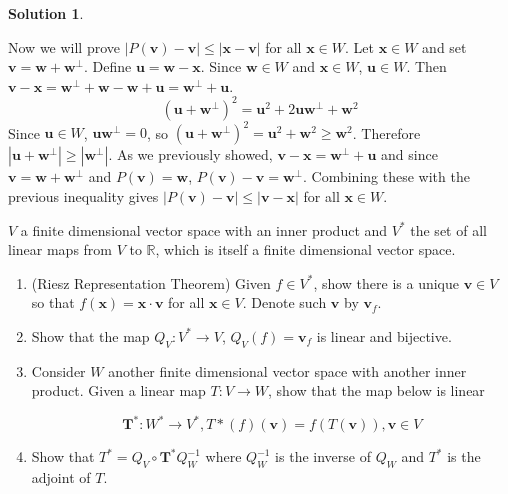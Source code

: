 \documentclass[11pt]{article}
\theoremstyle{definition}
\newenvironment{customex}[1]
  {\renewcommand\theinnercustomex{#1}\innercustomex}
  {\endinnercustomex}
\newtheorem*{solution}{Solution}
\newcommand{\R}{\mathbb{R}}
\newcommand{\vv}{\mathbf{v}}
\newcommand{\vu}{\mathbf{u}}
\newcommand{\vw}{\mathbf{w}}
\newcommand{\vx}{\mathbf{x}}
\begin{document}
\begin{solution}
\begin{enumerate}[label = \alph*)]
            Now we will prove $|P(\vv) - \vv| \le |\vx - \vv|$ for all $\vx \in W$. Let $\vx \in W$ and set $\vv = \vw + \vw^{\perp}$. Define $\vu = \vw - \vx$. Since $\vw \in W$ and $\vx \in W$, $\vu \in W$. Then $\vv -\vx = \vw^{\perp} + \vw - \vw + \vu = \vw^{\perp} + \vu$. $$(\vu + \vw^{\perp})^2 = \vu^2 +2\vu\vw^{\perp} + \vw^2$$Since $\vu \in W$, $\vu\vw^{\perp} = 0$, so $(\vu + \vw^{\perp})^2 = \vu^2 + \vw^2 \ge \vw^2$. Therefore $|\vu + \vw^{\perp}| \ge |\vw^{\perp}|$. As we previously showed, $\vv - \vx = \vw^{\perp} + \vu$ and since $\vv = \vw + \vw^{\perp}$ and $P(\vv) = \vw$, $P(\vv) - \vv = \vw^{\perp}$. Combining these with the previous inequality gives $|P(\vv) - \vv| \le |\vv - \vx|$ for all $\vx \in W$.
        \end{enumerate}
    \end{solution}

    \begin{customex}{\textbf{6}}
        $V$ a finite dimensional vector space with an inner product and $V^*$ the set of all linear maps from $V$ to $\R$, which is itself a finite dimensional vector space.
        \begin{enumerate}[label = \alph*)]
            \item (Riesz Representation Theorem) Given $f \in V^*$, show there is a unique $\vv \in V$ so that $f(\vx) = \vx\cdot \vv$ for all $\vx \in V$. Denote such $\vv$ by $\vv_f$.
            \item Show that the map $Q_V : V^* \to V$, $Q_V(f) = \vv_f$ is linear and bijective.
            \item Consider $W$ another finite dimensional vector space with another inner product. Given a linear map $T : V \to W$, show that the map below is linear
            
                $$\mathbf{T^*}:W^* \to V^*, T*(f)(\vv) = f(T(\vv)), \vv \in V$$
            \item Show that $T^* = Q_V \circ \mathbf{T^*} Q_W^{-1}$ where $Q_W^{-1}$ is the inverse of $Q_W$ and $T^*$ is the adjoint of $T$.
        \end{enumerate}
    \end{customex}
\end{document}
